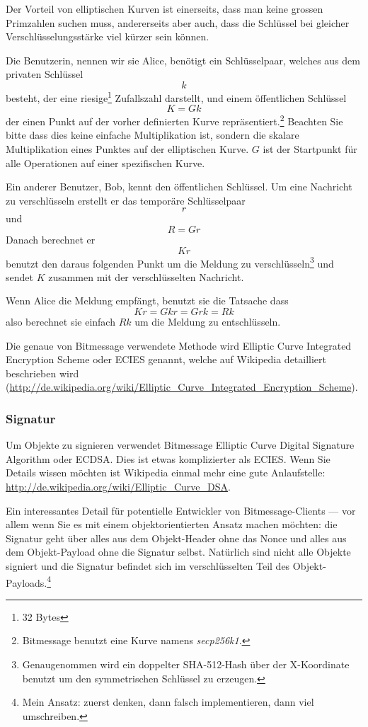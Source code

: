 \documentclass{bfh}
\begin{document}
  Der Vorteil von elliptischen Kurven ist einerseits, dass man keine grossen Primzahlen suchen muss, andererseits aber auch, dass die Schlüssel bei gleicher Verschlüsselungsstärke viel kürzer sein können.

  Die Benutzerin, nennen wir sie Alice, benötigt ein Schlüsselpaar, welches aus dem privaten Schlüssel
$$k$$
besteht, der eine riesige\footnote{32 Bytes} Zufallszahl darstellt, und einem öffentlichen Schlüssel
$$K = G k$$
der einen Punkt auf der vorher definierten Kurve repräsentiert.\footnote{Bitmessage benutzt eine Kurve namens \textit{secp256k1}.} Beachten Sie bitte dass dies keine einfache Multiplikation ist, sondern die skalare Multiplikation eines Punktes auf der elliptischen Kurve. $G$ ist der Startpunkt für alle Operationen auf einer spezifischen Kurve.

  Ein anderer Benutzer, Bob, kennt den öffentlichen Schlüssel. Um eine Nachricht zu verschlüsseln erstellt er das temporäre Schlüsselpaar
$$r$$
und
$$R = G r$$
Danach berechnet er
$$K r$$
benutzt den daraus folgenden Punkt um die Meldung zu verschlüsseln\footnote{Genaugenommen wird ein doppelter SHA-512-Hash über der X-Koordinate benutzt um den symmetrischen Schlüssel zu erzeugen.} und sendet $K$ zusammen mit der verschlüsselten Nachricht.

  Wenn Alice die Meldung empfängt, benutzt sie die Tatsache dass
$$K r = G k r = G r k = R k$$
also berechnet sie einfach $R k$ um die Meldung zu entschlüsseln.

  Die genaue von Bitmessage verwendete Methode wird Elliptic Curve Integrated Encryption Scheme oder ECIES genannt, welche auf Wikipedia detailliert beschrieben wird (\url{http://de.wikipedia.org/wiki/Elliptic_Curve_Integrated_Encryption_Scheme}).

  \subsubsection{Signatur}

  Um Objekte zu signieren verwendet Bitmessage Elliptic Curve Digital Signature Algorithm oder ECDSA. Dies ist etwas komplizierter als ECIES. Wenn Sie Details wissen möchten ist Wikipedia einmal mehr eine gute Anlaufstelle: \url{http://de.wikipedia.org/wiki/Elliptic_Curve_DSA}.

  Ein interessantes Detail für potentielle Entwickler von Bitmessage-Clients --- vor allem wenn Sie es mit einem objektorientierten Ansatz machen möchten: die Signatur geht über alles aus dem Objekt-Header ohne das Nonce und alles aus dem Objekt-Payload ohne die Signatur selbst. Natürlich sind nicht alle Objekte signiert und die Signatur befindet sich im verschlüsselten Teil des Objekt-Payloads.\footnote{Mein Ansatz: zuerst denken, dann falsch implementieren, dann viel umschreiben.}
\end{document}
